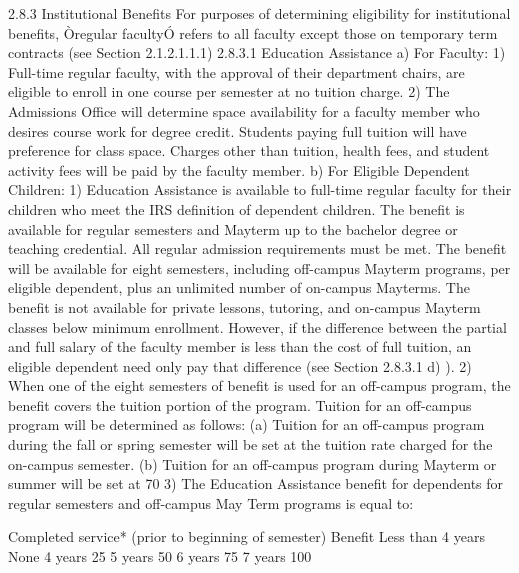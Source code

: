 \documentclass[letterpaper, 11pt]{article}
\begin{document}
	2.8.3 Institutional Benefits
	For purposes of determining eligibility for institutional benefits, Òregular facultyÓ refers to all faculty except those on temporary term contracts (see Section 2.1.2.1.1.1)
	2.8.3.1 Education Assistance
	a) For Faculty:
	1) Full-time regular faculty, with the approval of their department chairs, are eligible to enroll in one course per semester at no tuition charge.
	2) The Admissions Office will determine space availability for a faculty member who desires course work for degree credit.  Students paying full tuition will have preference for class space.  Charges other than tuition, health fees, and student activity fees will be paid by the faculty member.
	b) For Eligible Dependent Children:
	1) Education Assistance is available to full-time regular faculty for their children who meet the IRS definition of dependent children.  The benefit is available for regular semesters and Mayterm up to the bachelor degree or teaching credential. All regular admission requirements must be met.  The benefit will be available for eight semesters, including off-campus Mayterm programs, per eligible dependent, plus an unlimited number of on-campus Mayterms.  The benefit is not available for private lessons, tutoring, and on-campus Mayterm classes below minimum enrollment.  However, if the difference between the partial and full salary of the faculty member is less than the cost of full tuition, an eligible dependent need only pay that difference (see Section 2.8.3.1 d) ).
	2) When one of the eight semesters of benefit is used for an off-campus program, the benefit covers the tuition portion of the program.  Tuition for an off-campus program will be determined as follows:
	(a) Tuition for an off-campus program during the fall or spring semester will be set at the tuition rate charged for the on-campus semester.
	(b) Tuition for an off-campus program during Mayterm or summer will be set at 70%
	3) The Education Assistance benefit for dependents for regular semesters and off-campus May Term programs is equal to:

	Completed service* (prior to beginning of semester)
	Benefit
	Less than 4 years
	None
	4 years
	25%
	5 years
	50%
	6 years
	75%
	7 years
	100%
\end{document}
